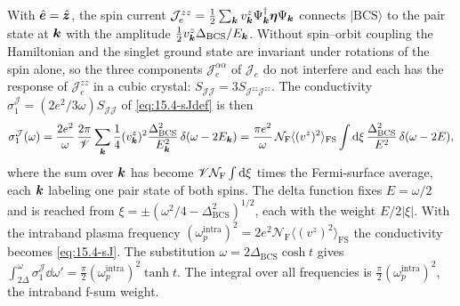 With $\hat{\bm{e}} = \hat{\bm{z}}$, the spin current $\mathcal{J}^{zz}_e = \frac12\sum_{\bm{k}}v^z_{\bm{k}}\Psi^\dagger_{\bm{k}}\boldsymbol{\eta}\Psi_{\bm{k}}$ connects $|\mathrm{BCS}\rangle$ to the pair state at $\bm{k}$ with the amplitude $\frac12v^z_{\bm{k}}\Delta_{\mathrm{BCS}}/E_{\bm{k}}$. Without spin--orbit coupling the Hamiltonian and the singlet ground state are invariant under rotations of the spin alone, so the three components $\mathcal{J}^{\alpha\alpha}_e$ of $\mathcal{J}_e$ do not interfere and each has the response of $\mathcal{J}^{zz}_e$ in a cubic crystal: $S_{\mathcal{J}\mathcal{J}} = 3S_{\mathcal{J}^{zz}\mathcal{J}^{zz}}$. The conductivity $\sigma_1^{\mathcal{J}} = (2e^2/3\omega)S_{\mathcal{J}\mathcal{J}}$ of \cref{eq:15.4-sJdef} is then
\begin{equation*}
  \sigma_1^{\mathcal{J}}(\omega) = \frac{2e^2}{\omega}\,\frac{2\pi}{\mathscr{V}}\sum_{\bm{k}}\frac14(v^z_{\bm{k}})^2\frac{\Delta_{\mathrm{BCS}}^2}{E_{\bm{k}}^2}\,\delta(\omega - 2E_{\bm{k}})
  = \frac{\pi e^2}{\omega}\,\mathcal{N}_{\mathrm{F}}\langle(v^z)^2\rangle_{\mathrm{FS}}\int\mathrm{d}\xi\,\frac{\Delta_{\mathrm{BCS}}^2}{E^2}\,\delta(\omega - 2E) ,
\end{equation*}
where the sum over $\bm{k}$ has become $\mathscr{V}\mathcal{N}_{\mathrm{F}}\int\mathrm{d}\xi$ times the Fermi-surface average, each $\bm{k}$ labeling one pair state of both spins. The delta function fixes $E = \omega/2$ and is reached from $\xi = \pm(\omega^2/4 - \Delta_{\mathrm{BCS}}^2)^{1/2}$, each with the weight $E/2|\xi|$. With the intraband plasma frequency $(\omega_p^{\mathrm{intra}})^2 = 2e^2\mathcal{N}_{\mathrm{F}}\langle(v^z)^2\rangle_{\mathrm{FS}}$ the conductivity becomes \cref{eq:15.4-sJ}. The substitution $\omega = 2\Delta_{\mathrm{BCS}}\cosh t$ gives $\int_{2\Delta}^{\omega}\sigma_1^{\mathcal{J}}\dd\omega' = \frac{\pi}{2}(\omega_p^{\mathrm{intra}})^2\tanh t$. The integral over all frequencies is $\frac{\pi}{2}(\omega_p^{\mathrm{intra}})^2$, the intraband f-sum weight.

